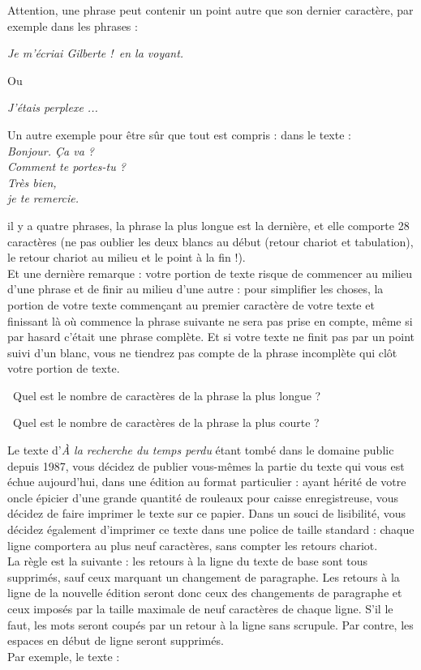 Attention, une phrase peut contenir un point autre que son dernier caractère, par exemple dans les 
phrases :
\begin{center}
\emph{Je m'écriai \og Gilberte !\fg\ en la voyant.}
\end{center}

Ou
\begin{center}
\emph{J'étais perplexe ...}
\end{center}

Un autre exemple pour être sûr que tout est compris : dans le texte :\\

\emph{
Bonjour. Ça va ?\\
Comment te portes-tu ?\\
\indent Très bien,\\ je te remercie.\\}

il y a quatre phrases, la phrase la plus longue est la dernière, et elle comporte 28 caractères (ne 
pas oublier les deux blancs au début (retour chariot et tabulation), le retour chariot au milieu et le point à la fin 
!).\\

Et une dernière remarque : votre portion de texte risque de commencer au milieu d'une phrase et de finir au milieu 
d'une autre : pour simplifier les choses, la portion de votre texte commençant au premier caractère de votre texte 
et finissant là où commence la phrase suivante ne sera pas prise en compte, même si par hasard c'était une phrase 
complète. Et si votre texte ne finit pas par un point suivi d'un blanc, vous ne tiendrez pas compte de la 
phrase incomplète qui clôt votre portion de texte.


\question\ Quel est le nombre de caractères de la phrase la plus longue ?

\medskip

\question\ Quel est le nombre de caractères de la phrase la plus courte ?

\vspace{1cm}

\noindent Le texte d'\emph{À la recherche du temps perdu} étant tombé dans le domaine public depuis 1987, 
vous décidez de publier vous-mêmes la partie du texte qui vous est échue aujourd'hui, dans une 
édition au format particulier : ayant hérité de votre oncle épicier d'une grande quantité de 
rouleaux pour caisse enregistreuse, vous décidez de faire imprimer le texte sur ce papier. Dans un 
souci de lisibilité, vous décidez également d'imprimer ce texte dans une police de taille standard 
: chaque ligne comportera au plus neuf caractères, sans compter les retours chariot.\\
La règle est la suivante : les retours à la ligne du texte de base sont tous supprimés, sauf ceux 
marquant un changement de paragraphe. Les retours à la ligne de la nouvelle édition seront donc 
ceux des changements de paragraphe et ceux imposés par la taille maximale de neuf caractères de 
chaque ligne. S'il le faut, les mots seront coupés par un retour à la ligne sans scrupule. Par 
contre, les espaces en début de ligne seront supprimés.\\
Par exemple, le texte :\\

